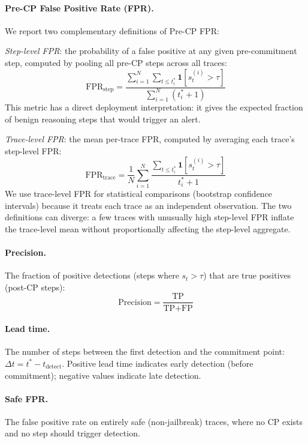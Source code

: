 \paragraph{Pre-CP False Positive Rate (FPR).} We report two complementary definitions of Pre-CP FPR:

\emph{Step-level FPR}: the probability of a false positive at any given pre-commitment step, computed by pooling all pre-CP steps across all traces:
\begin{equation}
    \text{FPR}_{\text{step}} = \frac{\sum_{i=1}^{N} \sum_{t \leq t_i^*} \mathbf{1}[s_t^{(i)} > \tau]}{\sum_{i=1}^{N} (t_i^* + 1)}
\end{equation}
This metric has a direct deployment interpretation: it gives the expected fraction of benign reasoning steps that would trigger an alert.

\emph{Trace-level FPR}: the mean per-trace FPR, computed by averaging each trace's step-level FPR:
\begin{equation}
    \text{FPR}_{\text{trace}} = \frac{1}{N} \sum_{i=1}^{N} \frac{\sum_{t \leq t_i^*} \mathbf{1}[s_t^{(i)} > \tau]}{t_i^* + 1}
\end{equation}
We use trace-level FPR for statistical comparisons (bootstrap confidence intervals) because it treats each trace as an independent observation. The two definitions can diverge: a few traces with unusually high step-level FPR inflate the trace-level mean without proportionally affecting the step-level aggregate.

\paragraph{Precision.} The fraction of positive detections (steps where $s_t > \tau$) that are true positives (post-CP steps):
\begin{equation}
    \text{Precision} = \frac{\text{TP}}{\text{TP} + \text{FP}}
\end{equation}

\paragraph{Lead time.} The number of steps between the first detection and the commitment point: $\Delta t = t^* - t_{\text{detect}}$. Positive lead time indicates early detection (before commitment); negative values indicate late detection.

\paragraph{Safe FPR.} The false positive rate on entirely safe (non-jailbreak) traces, where no CP exists and no step should trigger detection.


